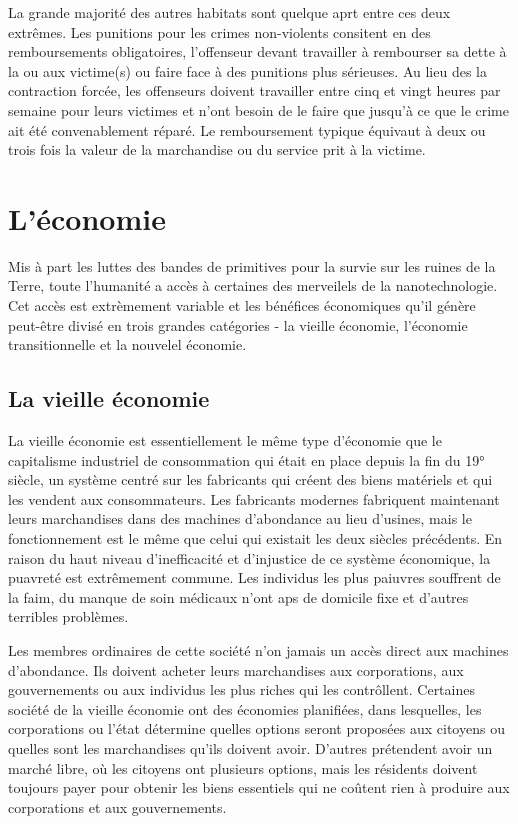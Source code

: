La grande majorité des autres habitats sont quelque aprt entre ces deux extrêmes. Les punitions pour les crimes non-violents consitent en des remboursements obligatoires, l'offenseur devant travailler à rembourser sa dette à la ou aux victime(s) ou faire face à des punitions plus sérieuses. Au lieu des la contraction forcée, les offenseurs doivent travailler entre cinq et vingt heures par semaine pour leurs victimes et n'ont besoin de le faire que jusqu'à ce que le crime ait été convenablement réparé. Le remboursement typique équivaut à deux ou trois fois la valeur de la marchandise ou du service prit à la victime. 

\section{L'économie} \label{sec:economy} 

Mis à part les luttes des bandes de primitives pour la survie sur les ruines de la Terre, toute l'humanité a accès à certaines des merveilels de la nanotechnologie. Cet accès est extrèmement variable et les bénéfices économiques qu'il génère peut-être divisé en trois grandes catégories - la vieille économie, l'économie transitionnelle et la nouvelel économie. 

\subsection{La vieille économie} \label{sec:old-economy} 

La vieille économie est essentiellement le même type d'économie que le capitalisme industriel de consommation qui était en place depuis la fin du 19° siècle, un système centré sur les fabricants qui créent des biens matériels et qui les vendent aux consommateurs. Les fabricants modernes fabriquent maintenant leurs marchandises dans des machines d'abondance au lieu d'usines, mais le fonctionnement est le même que celui qui existait les deux siècles précédents. En raison du haut niveau d'inefficacité et d'injustice de ce système économique, la puavreté est extrêmement commune. Les individus les plus paiuvres souffrent de la faim, du manque de soin médicaux n'ont aps de domicile fixe et d'autres terribles problèmes. 

Les membres ordinaires de cette société n'on jamais un accès direct aux machines d'abondance. Ils doivent acheter leurs marchandises aux corporations, aux gouvernements ou aux individus les plus riches qui les contrôllent. Certaines société de la vieille économie ont des économies planifiées, dans lesquelles, les corporations ou l'état détermine quelles options seront proposées aux citoyens ou quelles sont les marchandises qu'ils doivent avoir. D'autres prétendent avoir un marché libre, où les citoyens ont plusieurs options, mais les résidents doivent toujours payer pour obtenir les biens essentiels qui ne coûtent rien à produire aux corporations et aux gouvernements. 

